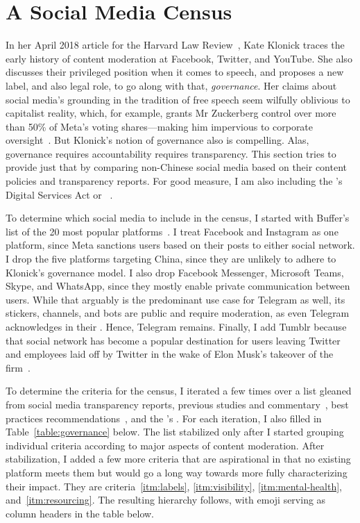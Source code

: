 \section{A Social Media Census}
\label{sec:census}

In her April 2018 article for the Harvard Law Review~\cite{Klonick2018}, Kate
Klonick traces the early history of content moderation at Facebook, Twitter, and
YouTube. She also discusses their privileged position when it comes to speech,
and proposes a new label, and also legal role, to go along with that,
\emph{governance}. Her claims about social media's grounding in the tradition of
free speech seem wilfully oblivious to capitalist reality, which, for example,
grants Mr Zuckerberg control over more than 50\% of Meta's voting
shares---making him impervious to corporate
oversight~\cite{LauricellaNorton2021}. But Klonick's notion of governance also
is compelling. Alas, governance requires accountability requires transparency.
This section tries to provide just that by comparing non-Chinese social media
based on their content policies and transparency reports. For good measure, I am
also including the 's Digital Services Act or
~\cite{EuropeanParliamentAndCouncil2022}.

To determine which social media to include in the census, I started with
Buffer's list of the 20 most popular platforms~\cite{Lua2022}. I treat Facebook
and Instagram as one platform, since Meta sanctions users based on their posts
to either social network. I drop the five platforms targeting China, since they
are unlikely to adhere to Klonick's governance model. I also drop Facebook
Messenger, Microsoft Teams, Skype, and WhatsApp, since they mostly enable
private communication between users. While that arguably is the predominant use
case for Telegram as well, its stickers, channels, and bots are public and
require moderation, as even Telegram acknowledges in their . Hence,
Telegram remains. Finally, I add Tumblr because that social network has become a
popular destination for users leaving Twitter and employees laid off by Twitter
in the wake of Elon Musk's takeover of the firm~\cite{Patel2022}.

To determine the criteria for the census, I iterated a few times over a list
gleaned from social media transparency reports, previous studies and
commentary~\cite{BradfordGriselea2019,CrockerGebhartea2019,Douek2022}, best
practices
recommendations~\cite{AccessNowACLUFoundationOfNorthernCaliforniaea2021}, and
the 's . For each iteration, I also filled in
Table~\ref{table:governance} below. The list stabilized only after I started
grouping individual criteria according to major aspects of content moderation.
After stabilization, I added a few more criteria that are aspirational in that
no existing platform meets them but would go a long way towards more fully
characterizing their impact. They are criteria~\ref{itm:labels},
\ref{itm:visibility}, \ref{itm:mental-health}, and~\ref{itm:resourcing}. The
resulting hierarchy follows, with emoji serving as column headers in the table
below.

